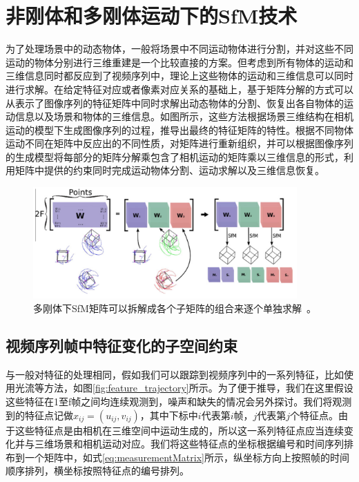 \chapter{非刚体和多刚体运动下的SfM技术}
\label{sec:non-rigid_SfM}
为了处理场景中的动态物体，一般将场景中不同运动物体进行分割，并对这些不同运动的物体分别进行三维重建是一个比较直接的方案。但考虑到所有物体的运动和三维信息同时都反应到了视频序列中，理论上这些物体的运动和三维信息可以同时进行求解\cite{Tomasi1992Shape}。在给定特征对应或者像素对应关系的基础上，基于矩阵分解的方式可以从表示了图像序列的特征矩阵中同时求解出动态物体的分割、恢复出各自物体的运动信息以及场景和物体的三维信息。如图\cite{zappella2013joint}所示，这些方法根据场景三维结构在相机运动的模型下生成图像序列的过程，推导出最终的特征矩阵的特性。根据不同物体运动不同在矩阵中反应出的不同性质，对矩阵进行重新组织，并可以根据图像序列的生成模型将每部分的矩阵分解乘包含了相机运动的矩阵乘以三维信息的形式，利用矩阵中提供的约束同时完成运动物体分割、运动求解以及三维信息恢复。

\begin{figure}[thbp]
	\centering
	\includegraphics[width=0.9\textwidth]{figs/1-3/matrix.jpeg}
	\caption{多刚体下SfM矩阵可以拆解成各个子矩阵的组合来逐个单独求解~\cite{fox1999}。}
	\label{fig:rhino}
\end{figure}

\section{视频序列帧中特征变化的子空间约束}\label{subsec:subspace}
与一般对特征的处理相同，假如我们可以跟踪到视频序列中的一系列特征，比如使用光流等方法\cite{Fanani2016Keypoint}，如图\ref{fig:feature_trajectory}所示。为了便于推导，我们在这里假设这些特征在1至f帧之间均连续观测到，噪声和缺失的情况会另外探讨。我们将观测到的特征点记做$x_{ij}=(u_{ij},v_{ij})$，其中下标中$i$代表第$i$帧，$j$代表第$j$个特征点。由于这些特征点是由相机在三维空间中运动生成的，所以这一系列特征点应当连续变化并与三维场景和相机运动对应。我们将这些特征点的坐标根据编号和时间序列排布到一个矩阵中，如式\eqref{eq:measurementMatrix}所示，纵坐标方向上按照帧的时间顺序排列，横坐标按照特征点的编号排列。

